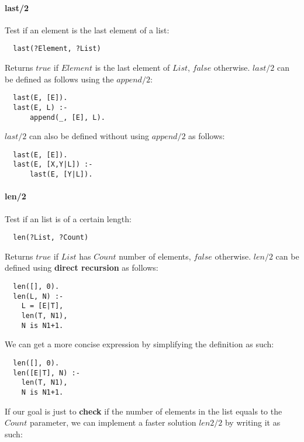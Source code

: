 \documentclass{article}
\begin{document}
\begin{multicols}{2}
  \paragraph{last/2} Test if an element is the last element of a list:
  
  \begin{lstlisting}
  last(?Element, ?List)
  \end{lstlisting} 
  
  Returns $true$ if $Element$ is the last element of $List$, $false$ otherwise. $last/2$ can be defined as follows using the $append/2$:
  
  \begin{lstlisting}
  last(E, [E]).
  last(E, L) :-
      append(_, [E], L).
  \end{lstlisting} 
  
  $last/2$ can also be defined without using $append/2$ as follows:  
  
  \begin{lstlisting}
  last(E, [E]).
  last(E, [X,Y|L]) :-
      last(E, [Y|L]).
  \end{lstlisting} 
  
  \paragraph{len/2} Test if an list is of a certain length:
  
  \begin{lstlisting}
  len(?List, ?Count)
  \end{lstlisting} 
  
  Returns $true$ if $List$ has $Count$ number of elements, $false$ otherwise. $len/2$ can be defined using {\bf direct recursion} as follows:
  
  \begin{lstlisting}
  len([], 0).
  len(L, N) :-
	L = [E|T],
	len(T, N1),
	N is N1+1.
  \end{lstlisting} 
  
  We can get a more concise expression by simplifying the definition as such:  
  
  \begin{lstlisting}
  len([], 0).
  len([E|T], N) :-
	len(T, N1),
	N is N1+1.
  \end{lstlisting} 

  If our goal is just to {\bf check} if the number of elements in the list equals to the $Count$ parameter, we can implement a faster solution $len2/2$ by writing it as such:
  

\end{multicols}
\end{document}
